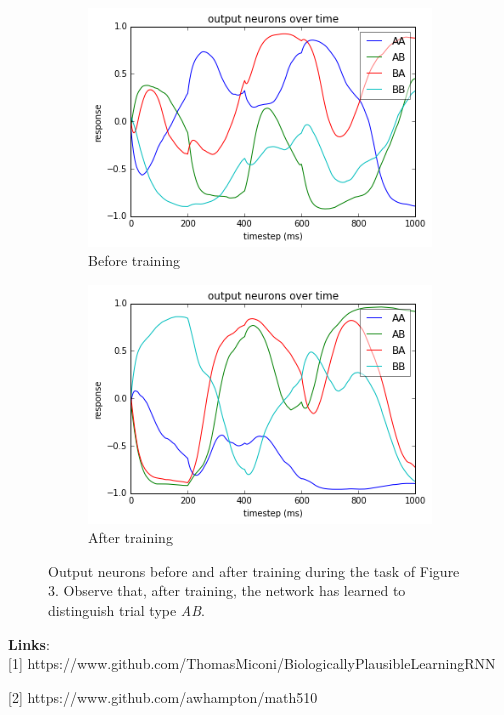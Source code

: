 \documentclass{article}
\theoremstyle{plain}
\theoremstyle{definition}
\theoremstyle{remark}
\begin{document}
\begin{figure}
\begin{subfigure}{.5\textwidth}
  \centering
  \includegraphics[width=.8\linewidth]{before4}
  \caption{Before training}
  \label{fig:sfig1}
\end{subfigure}%
\begin{subfigure}{.5\textwidth}
  \centering
  \includegraphics[width=.8\linewidth]{after4}
  \caption{After training}
  \label{fig:sfig2}
\end{subfigure}
\caption{Output neurons before and after training during the task of Figure 3. Observe that, after training, the network has learned to distinguish trial type \textit{AB}.}
\label{fig:fig}
\end{figure}


\textbf{Links}: \\

[1] https://www.github.com/ThomasMiconi/BiologicallyPlausibleLearningRNN

[2] https://www.github.com/awhampton/math510
\end{document}
